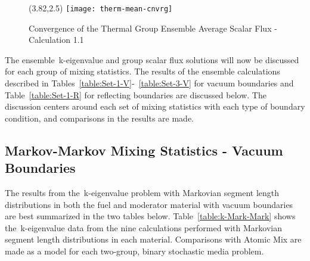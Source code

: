	\vspace{0.2in}
	\begin{figure}[htbp]
		\begin{center}
			\begin{minipage}[t]{3.82in}
			\begin{picture}(3.82,2.5)
	            	{\texttt{[image: therm-mean-cnvrg]}}
			\end{picture}
			\caption{\label{fig:Therm-Cnvrg} Convergence of the Thermal Group Ensemble
				Average Scalar Flux - Calculation 1.1}
			\end{minipage} %
		\end{center}
	\end{figure}	
	\vspace{-0.25in} 
	
\noindent 
	\indent The ensemble~k-eigenvalue and group scalar flux solutions will now be discussed
	for each group of mixing statistics.  The results of the ensemble calculations described in
	Tables~\ref{table:Set-1-V}-~\ref{table:Set-3-V} for vacuum boundaries and 
	Table~\ref{table:Set-1-R} for reflecting boundaries are discussed below.  The discussion
	centers around each set of mixing statistics with each type of boundary condition, and 
	comparisons in the results are made. 

\belowSubSecSkip

\subsection{Markov-Markov Mixing Statistics - Vacuum Boundaries}
\label{sec:Results-and-Conc-MM-V}

\noindent
	\indent The results from the~k-eigenvalue problem with Markovian segment length
	distributions in both the fuel and moderator material with vacuum boundaries are best
	summarized in the two tables below.  Table~\ref{table:k-Mark-Mark} shows the~k-eigenvalue
	data from the nine calculations performed with Markovian segment length distributions
	in each material.  Comparisons with Atomic Mix are made as a model for each two-group,
	binary stochastic media problem.
	
